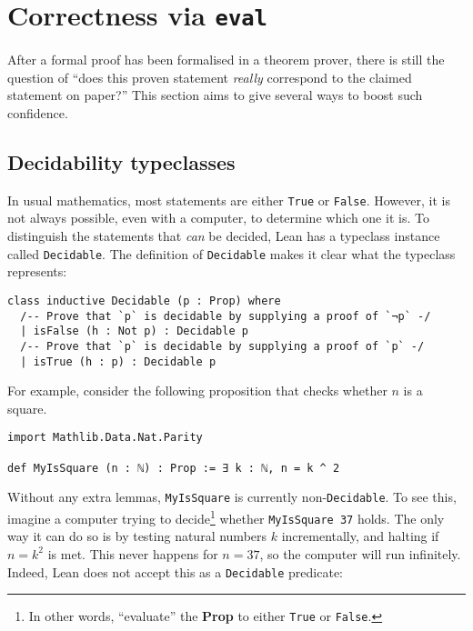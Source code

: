 \section{Correctness via \texttt{eval}} \label{sec:correctness}

After a formal proof has been formalised in a theorem prover, there is still the question of ``does this proven statement \textit{really} correspond to the claimed statement on paper?'' This section aims to give several ways to boost such confidence.

\subsection{Decidability typeclasses}

In usual mathematics, most statements are either \texttt{True} or \texttt{False}. However, it is not always possible, even with a computer, to determine which one it is. To distinguish the statements that \textit{can} be decided, Lean has a typeclass instance called \texttt{Decidable}. The definition of \texttt{Decidable} makes it clear what the typeclass represents:

\begin{verbatim}
class inductive Decidable (p : Prop) where
  /-- Prove that `p` is decidable by supplying a proof of `¬p` -/
  | isFalse (h : Not p) : Decidable p
  /-- Prove that `p` is decidable by supplying a proof of `p` -/
  | isTrue (h : p) : Decidable p
\end{verbatim}

For example, consider the following proposition that checks whether \(n\) is a square.

\begin{verbatim}
import Mathlib.Data.Nat.Parity

def MyIsSquare (n : ℕ) : Prop := ∃ k : ℕ, n = k ^ 2
\end{verbatim}

Without any extra lemmas, \texttt{MyIsSquare} is currently non-\texttt{Decidable}. To see this, imagine a computer trying to decide\footnote{In other words, ``evaluate'' the \textbf{Prop} to either \texttt{True} or \texttt{False}.} whether \texttt{MyIsSquare 37} holds. The only way it can do so is by testing natural numbers \(k\) incrementally, and halting if \(n = k ^ 2\) is met. This never happens for \(n = 37\), so the computer will run infinitely. Indeed, Lean does not accept this as a \texttt{Decidable} predicate:

